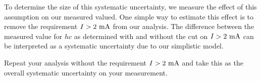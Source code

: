 To determine the size of this systematic uncertainty, we measure the
effect of this assumption on our measured valued.  One simple way to
estimate this effect is to remove the requirement $I>2~\rm mA$ from
our analysis.  The difference between the measured value for $hc$ as
determined with and without the cut on $I>2~\rm mA$ can be interpreted
as a systematic uncertainty due to our simplistic model.

\begin{plot}
Repeat your analysis without the requirement $I > 2~\rm mA$ and take
this as the overall systematic uncertainty on your measurement.
\end{plot}













